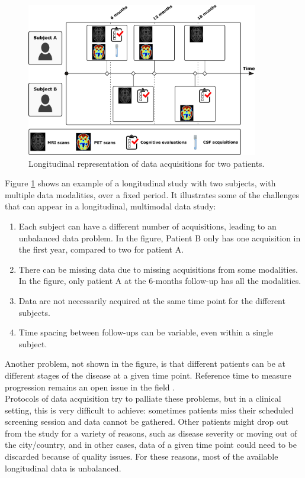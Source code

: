 \begin{figure}[htbp]
  \centering
  \includegraphics[width=0.9\textwidth]{figures/introduction/Fig-progression.pdf}
  \caption{Longitudinal representation of data acquisitions for two patients.}
  \label{long}
\end{figure}

Figure \ref{long} shows an example of a longitudinal study with two subjects, with multiple data modalities, over a fixed period. It illustrates some of the challenges that can appear in a longitudinal, multimodal data study: \\

\begin{enumerate}
\item Each subject can have a different number of acquisitions, leading to an unbalanced data problem. In the figure, Patient B only has one acquisition in the first year, compared to two for patient A.
\item There can be missing data due to missing acquisitions from some modalities. In the figure, only patient A at the 6-months follow-up has all the modalities.
\item Data are not necessarily acquired at the same time point for the different subjects.
\item Time spacing between follow-ups can be variable, even within a single subject.
\end{enumerate}

Another problem, not shown in the figure, is that different patients can be at different stages of the disease at a given time point. Reference time to measure progression remains an open issue in the field \cite{Ashford2001}.  \\

Protocols of data acquisition try to palliate these problems, but in a clinical setting, this is very difficult to achieve: sometimes patients miss their scheduled screening session and data cannot be gathered. Other patients might drop out from the study for a variety of reasons, such as disease severity or moving out of the city/country, and in other cases, data of a given time point could need to be discarded because of quality issues. For these reasons, most of the available longitudinal data is unbalanced. \\

